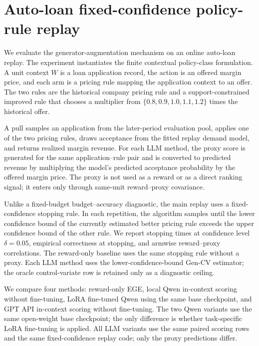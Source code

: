 \section{Auto-loan fixed-confidence policy-rule replay}
\label{sec:autoloan-llm-replay}

We evaluate the generator-augmentation mechanism on an online auto-loan replay. The experiment instantiates the finite contextual policy-class formulation. A unit context \(W\) is a loan application record, the action is an offered margin price, and each arm is a pricing rule mapping the application context to an offer. The two rules are the historical company pricing rule and a support-constrained improved rule that chooses a multiplier from \(\{0.8,0.9,1.0,1.1,1.2\}\) times the historical offer.

A pull samples an application from the later-period evaluation pool, applies one of the two pricing rules, draws acceptance from the fitted replay demand model, and returns realized margin revenue. For each LLM method, the proxy score is generated for the same application--rule pair and is converted to predicted revenue by multiplying the model's predicted acceptance probability by the offered margin price. The proxy is not used as a reward or as a direct ranking signal; it enters only through same-unit reward--proxy covariance.

Unlike a fixed-budget budget--accuracy diagnostic, the main replay uses a fixed-confidence stopping rule. In each repetition, the algorithm samples until the lower confidence bound of the currently estimated better pricing rule exceeds the upper confidence bound of the other rule. We report stopping times at confidence level \(\delta=0.05\), empirical correctness at stopping, and armwise reward--proxy correlations. The reward-only baseline uses the same stopping rule without a proxy. Each LLM method uses the lower-confidence-bound Gen-CV estimator; the oracle control-variate row is retained only as a diagnostic ceiling.

We compare four methods: reward-only EGE, local Qwen in-context scoring without fine-tuning, LoRA fine-tuned Qwen using the same base checkpoint, and GPT API in-context scoring without fine-tuning. The two Qwen variants use the same open-weight base checkpoint; the only difference is whether task-specific LoRA fine-tuning is applied. All LLM variants use the same paired scoring rows and the same fixed-confidence replay code; only the proxy predictions differ.
